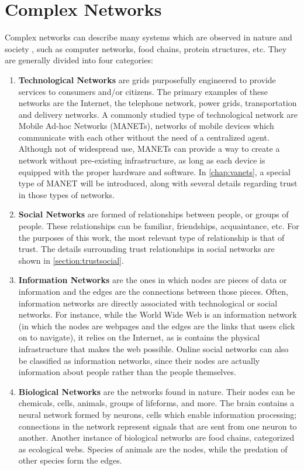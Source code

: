 \chapter{Complex Networks}
\label{chap:complexnetworks}

Complex networks can describe many systems which are observed in nature and society \cite{newmannetworks}, such as computer networks, food chains, protein structures, etc. 
They are generally divided into four categories:

\begin{enumerate}
	\item \textbf{Technological Networks} are grids purposefully engineered to provide services to consumers and/or citizens.
	 	The primary examples of these networks are the Internet, the telephone network, power grids, transportation and delivery networks.
	 	A commonly studied type of technological network are Mobile Ad-hoc Networks (MANETs), networks of mobile devices which communicate with each other without the need of a centralized agent.
		Although not of widespread use, MANETs can provide a way to create a network without pre-existing infrastructure, as long as each device is equipped with the proper hardware and software.
		In \autoref{chap:vanets}, a special type of MANET will be introduced, along with several details regarding trust in those types of networks.
	\item \textbf{Social Networks} are formed of relationships between people, or groups of people.
		These relationships can be familiar, friendships, acquaintance, etc.
		For the purposes of this work, the most relevant type of relationship is that of trust.
		The details surrounding trust relationships in social networks are shown in \autoref{section:trustsocial}.
	\item \textbf{Information Networks} are the ones in which nodes are pieces of data or information and the edges are the connections between those pieces.
		Often, information networks are directly associated with technological or social networks.
		For instance, while the World Wide Web is an information network (in which the nodes are webpages and the edges are the links that users click on to navigate), it relies on the Internet, as is contains the physical infrastructure that makes the web possible.
		Online social networks can also be classified as information networks, since their nodes are actually information about people rather than the people themselves.
	\item \textbf{Biological Networks} are the networks found in nature.
		Their nodes can be chemicals, cells, animals, groups of lifeforms, and more.
		The brain contains a neural network formed by neurons, cells which enable information processing; connections in the network represent signals that are sent from one neuron to another.
		Another instance of biological networks are food chains, categorized as ecological webs.
		Species of animals are the nodes, while the predation of other species form the edges.
		
\end{enumerate}

